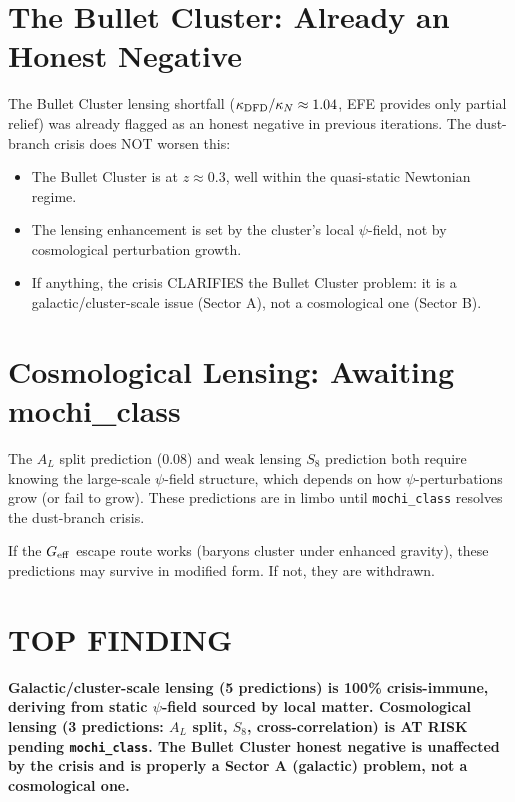 \documentclass[11pt]{article}
\begin{document}
\section{The Bullet Cluster: Already an Honest Negative}

The Bullet Cluster lensing shortfall ($\kappa_{\rm DFD}/\kappa_N \approx
1.04$, EFE provides only partial relief) was already flagged as an honest
negative in previous iterations. The dust-branch crisis does NOT worsen
this:

\begin{itemize}
\item The Bullet Cluster is at $z \approx 0.3$, well within the
  quasi-static Newtonian regime.
\item The lensing enhancement is set by the cluster's local $\psi$-field,
  not by cosmological perturbation growth.
\item If anything, the crisis CLARIFIES the Bullet Cluster problem:
  it is a galactic/cluster-scale issue (Sector A), not a cosmological
  one (Sector B).
\end{itemize}

\section{Cosmological Lensing: Awaiting mochi\_class}

The $A_L$ split prediction (0.08) and weak lensing $S_8$ prediction
both require knowing the large-scale $\psi$-field structure, which
depends on how $\psi$-perturbations grow (or fail to grow). These
predictions are in limbo until \texttt{mochi\_class} resolves the
dust-branch crisis.

If the $G_{\rm eff}$ escape route works (baryons cluster under
enhanced gravity), these predictions may survive in modified form.
If not, they are withdrawn.

\section*{TOP FINDING}

\begin{tcolorbox}[colback=blue!5!white, colframe=blue!70!black]
\textbf{Galactic/cluster-scale lensing (5 predictions) is 100\%
crisis-immune, deriving from static $\psi$-field sourced by local
matter. Cosmological lensing (3 predictions: $A_L$ split, $S_8$,
cross-correlation) is AT RISK pending \texttt{mochi\_class}. The Bullet
Cluster honest negative is unaffected by the crisis and is properly
a Sector A (galactic) problem, not a cosmological one.}
\end{tcolorbox}
\end{document}

